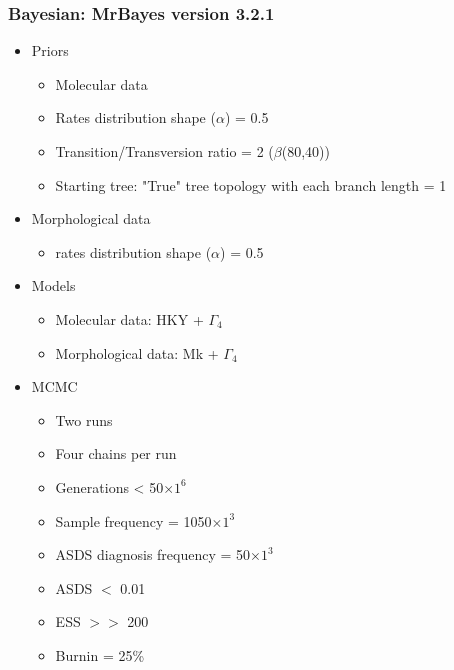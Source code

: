 \subsubsection{Bayesian: MrBayes version 3.2.1 \citep{Ronquist2012mrbayes}}

\begin{itemize}
  \item Priors
  \begin{itemize}
    \item Molecular data
    \item Rates distribution shape ($\alpha$) = 0.5
    \item Transition/Transversion ratio = 2 ($\beta$(80,40))
    \item Starting tree: "True" tree topology with each branch length = 1
  \end{itemize}
  \item Morphological data
  \begin{itemize}
    \item rates distribution shape ($\alpha$) = 0.5
  \end{itemize}
  \item Models
  \begin{itemize}
    \item Molecular data: HKY + $\Gamma_4$
    \item Morphological data: Mk + $\Gamma_4$
  \end{itemize}
  \item MCMC
  \begin{itemize}
    \item Two runs
    \item Four chains per run
    \item Generations < 50$\times$$1^6$
    \item Sample frequency = 1050$\times$$1^3$
    \item ASDS diagnosis frequency = 50$\times$$1^3$
    \item ASDS $<$ 0.01
    \item ESS $>>$ 200
    \item Burnin = 25\%
  \end{itemize}
\end{itemize}